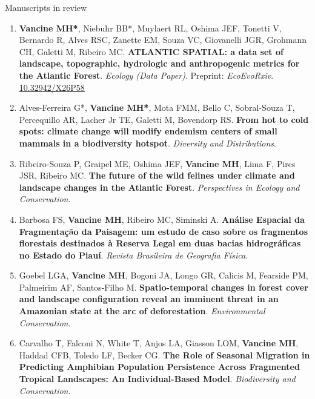 \documentclass{resume}
\begin{document}

\begin{rSection}{Manuscripts in review}

\begin{enumerate} 

\item {\bf Vancine MH*}, Niebuhr BB*, Muylaert RL, Oshima JEF, Tonetti V, Bernardo R, Alves RSC, Zanette EM, Souza VC, Giovanelli JGR, Grohmann CH, Galetti M, Ribeiro MC. {\bf ATLANTIC  SPATIAL:  a  data  set  of  landscape,  topographic,  hydrologic  and  anthropogenic metrics for the Atlantic Forest}. {\it Ecology (Data Paper)}. Preprint: {\it EcoEvoRxiv}. \href{https://doi.org/10.32942/X26P58}{\underline{10.32942/X26P58}}

\item Alves-Ferreira G*, {\bf Vancine MH*}, Mota FMM, Bello C, Sobral-Souza T, Percequillo AR, Lacher Jr TE, Galetti M, Bovendorp RS. {\bf From hot to cold spots: climate change will modify endemism centers of small mammals in a biodiversity hotspot}. {\it Diversity and Distributions}.

\item Ribeiro-Souza P, Graipel ME, Oshima JEF, {\bf Vancine MH}, Lima F, Pires JSR, Ribeiro MC. {\bf The future of the wild felines under climate and landscape changes in the Atlantic Forest}. {\it Perspectives in Ecology and Conservation}.

\item Barbosa FS, {\bf Vancine MH}, Ribeiro MC, Siminski A. {\bf Análise Espacial da Fragmentação da Paisagem: um estudo de caso sobre os fragmentos florestais destinados à Reserva Legal em duas bacias hidrográficas no Estado do Piauí}. {\it Revista Brasileira de Geografia Física.}

\item Goebel LGA, {\bf Vancine MH}, Bogoni JA, Longo GR, Calicis M, Fearside PM, Palmeirim AF, Santos-Filho M. {\bf Spatio-temporal changes in forest cover and landscape configuration reveal an imminent threat in an Amazonian state at the arc of deforestation}. {\it Environmental Conservation.}

\item Carvalho T, Falconi N, White T, Anjos LA, Giasson LOM, {\bf Vancine MH}, Haddad CFB, Toledo LF, Becker CG. {\bf The Role of Seasonal Migration in Predicting Amphibian Population Persistence Across Fragmented Tropical Landscapes: An Individual-Based Model}. {\it Biodiversity and Conservation.}


\end{enumerate}
\end{rSection}
\end{document}
